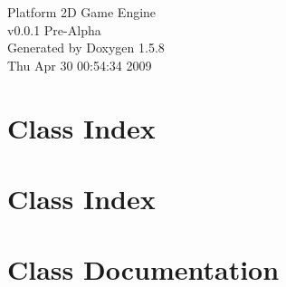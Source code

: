 \documentclass[a4paper]{book}
\begin{document}
\begin{titlepage}
\vspace*{7cm}
\begin{center}
{\Large Platform 2D Game Engine \\[1ex]\large v0.0.1 Pre-Alpha }\\
\vspace*{1cm}
{\large Generated by Doxygen 1.5.8}\\
\vspace*{0.5cm}
{\small Thu Apr 30 00:54:34 2009}\\
\end{center}
\end{titlepage}
\clearemptydoublepage
{}
\tableofcontents
\clearemptydoublepage
{}
\chapter{Class Index}

\chapter{Class Index}

\chapter{Class Documentation}






\printindex
\end{document}
